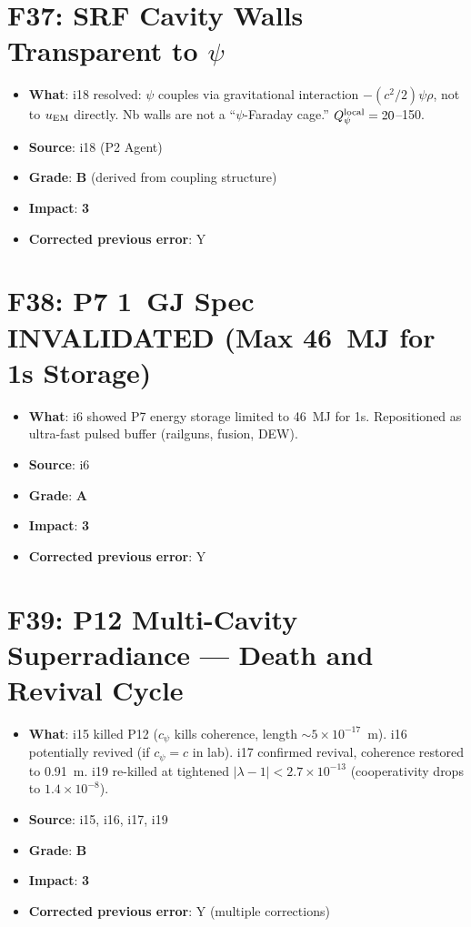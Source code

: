\documentclass[11pt,a4paper]{article}
\newcommand{\grade}[1]{\textbf{#1}}
\newcommand{\impact}[1]{\textbf{#1}}
\begin{document}
\section{F37: SRF Cavity Walls Transparent to $\psi$}
\begin{itemize}[nosep]
\item \textbf{What}: i18 resolved: $\psi$ couples via gravitational interaction $-(c^2/2)\psi\rho$, not to $u_{\rm EM}$ directly. Nb walls are not a ``$\psi$-Faraday cage.'' $Q_\psi^{\rm local} = 20$--150.
\item \textbf{Source}: i18 (P2 Agent)
\item \textbf{Grade}: \grade{B} (derived from coupling structure)
\item \textbf{Impact}: \impact{3}
\item \textbf{Corrected previous error}: Y
\end{itemize}

\section{F38: P7 1~GJ Spec INVALIDATED (Max 46~MJ for 1s Storage)}
\begin{itemize}[nosep]
\item \textbf{What}: i6 showed P7 energy storage limited to 46~MJ for 1s. Repositioned as ultra-fast pulsed buffer (railguns, fusion, DEW).
\item \textbf{Source}: i6
\item \textbf{Grade}: \grade{A}
\item \textbf{Impact}: \impact{3}
\item \textbf{Corrected previous error}: Y
\end{itemize}

\section{F39: P12 Multi-Cavity Superradiance --- Death and Revival Cycle}
\begin{itemize}[nosep]
\item \textbf{What}: i15 killed P12 ($c_\psi$ kills coherence, length $\sim 5 \times 10^{-17}$~m). i16 potentially revived (if $c_\psi = c$ in lab). i17 confirmed revival, coherence restored to 0.91~m. i19 re-killed at tightened $|\lambda-1| < 2.7 \times 10^{-13}$ (cooperativity drops to $1.4 \times 10^{-8}$).
\item \textbf{Source}: i15, i16, i17, i19
\item \textbf{Grade}: \grade{B}
\item \textbf{Impact}: \impact{3}
\item \textbf{Corrected previous error}: Y (multiple corrections)
\end{itemize}
\end{document}
